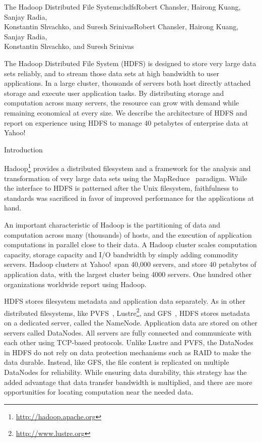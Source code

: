 \begin{aosachaptertoc}{The Hadoop Distributed File System}{s:hdfs}{Robert Chansler, Hairong Kuang, Sanjay Radia, \\ Konstantin Shvachko, and Suresh Srinivas}{Robert Chansler, Hairong Kuang, Sanjay Radia, \\ \hspace*{0.9cm} Konstantin Shvachko, and Suresh Srinivas}

The Hadoop Distributed File System (HDFS) is designed to store very
large data sets reliably, and to stream those data sets at high
bandwidth to user applications. In a large cluster, thousands of
servers both host directly attached storage and execute user
application tasks. By distributing storage and computation across many
servers, the resource can grow with demand while remaining economical
at every size. We describe the architecture of HDFS and report on
experience using HDFS to manage 40 petabytes of enterprise data at
Yahoo!

\begin{aosasect1}{Introduction}

Hadoop\footnote{\url{http://hadoop.apache.org}} provides a distributed
filesystem and a framework for the analysis and transformation of
very large data sets using the MapReduce~\cite{bib:dean:mapreduce}
paradigm.  While the interface to HDFS is patterned after the Unix
filesystem, faithfulness to standards was sacrificed in favor of
improved performance for the applications at hand.

An important characteristic of Hadoop is the partitioning of data and
computation across many (thousands) of hosts, and the execution of
application computations in parallel close to their data. A Hadoop
cluster scales computation capacity, storage capacity and I/O
bandwidth by simply adding commodity servers. Hadoop clusters at
Yahoo!\ span 40,000 servers, and store 40 petabytes of application
data, with the largest cluster being 4000 servers. One hundred other
organizations worldwide report using Hadoop.

HDFS stores filesystem metadata and application data separately. As
in other distributed filesystems, like PVFS~\cite{bib:carns:pvfs},
Lustre\footnote{\url{http://www.lustre.org}}, and GFS~\cite{bib:ghemawat:gfs,bib:mckusick:gfs},
HDFS stores metadata on a
dedicated server, called the NameNode. Application data are stored on
other servers called DataNodes.  All servers are fully connected and
communicate with each other using TCP-based protocols.  Unlike Lustre
and PVFS, the DataNodes in HDFS do not rely on data protection mechanisms
such as RAID to make the data durable.  Instead, like GFS, the file
content is replicated on multiple DataNodes for reliability. While
ensuring data durability, this strategy has the added advantage that
data transfer bandwidth is multiplied, and there are more
opportunities for locating computation near the needed data.


\end{aosasect1}
\end{aosachaptertoc}
